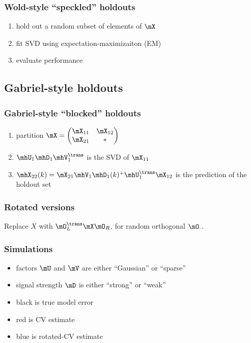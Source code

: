 \documentclass[14pt]{beamer}
\begin{document}
\begin{frame}
  \frametitle{Wold-style ``speckled'' holdouts}
  \begin{enumerate}
    \item hold out a random subset of elements of $\mX$
    \item fit SVD using expectation-maximizaiton (EM)
    \item evaluate performance
  \end{enumerate}
\end{frame}

\subsection{Gabriel-style holdouts}

\begin{frame}
  \frametitle{Gabriel-style ``blocked'' holdouts}
  \begin{enumerate}
    \item partition
    \(
      \mX = \left(\begin{matrix} \mX_{11} & \mX_{12} \\ \mX_{21} & \ast \end{matrix}\right)
    \)
    \item $\mhU_1 \mhD_1 \mhV_1^\trans$ is the SVD of $\mX_{11}$
    \item $\mhX_{22}(k) = \mX_{21} \mhV_1 \mhD_1(k)^+ \mhU_1^\trans \mX_{12}$ is the prediction of the holdout set
  \end{enumerate}
\end{frame}

\begin{frame}
  \frametitle{Rotated versions}
  Replace $X$ with $\mO_L^\trans \mX \mO_R$, for random orthogonal $\mO_\cdot$. 
\end{frame}

\begin{frame}
  \frametitle{Simulations}
  \begin{itemize}
    \item factors $\mU$ and $\mV$ are either ``Gaussian'' or ``sparse''
    \item signal strength $\mD$ is either ``strong'' or ``weak''
    \item black is true model error
    \item red is CV estimate
    \item blue is rotated-CV estimate
  \end{itemize}
\end{frame}
\end{document}
